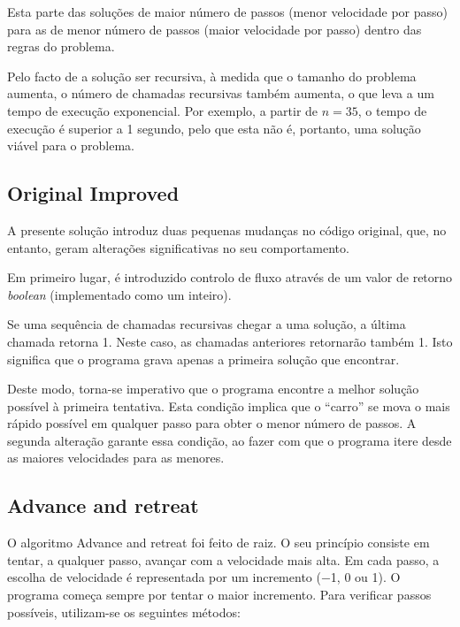 \documentclass[portuguese,11pt,a4paper,titlepage]{article}
\newcommand{\extrang}[1]{\textit{#1}}
\newcommand{\srcdir}{..}
\begin{document}
Esta parte das soluções de maior número de passos (menor velocidade por passo) para
as de menor número de passos (maior velocidade por passo) dentro das regras do problema.

Pelo facto de a solução ser recursiva, à medida que o tamanho do problema aumenta,
o número de chamadas recursivas também aumenta, o que leva a um tempo de execução exponencial.
Por exemplo, a partir de \begin{math}n = 35\end{math}, o tempo de execução é superior a 1 segundo,
pelo que esta não é, portanto, uma solução viável para o problema. 

\subsection{Original Improved} \label{original_improved}
A presente solução introduz duas pequenas mudanças no código original, que, no entanto,
geram alterações significativas no seu comportamento.

Em primeiro lugar, é introduzido controlo de fluxo através de um valor de retorno
\extrang{boolean} (implementado como um inteiro).

Se uma sequência de chamadas recursivas chegar a uma solução, a última chamada
retorna 1. 
Neste caso, as chamadas anteriores retornarão também 1.
Isto significa que o programa grava apenas a primeira solução que encontrar.

Deste modo, torna-se imperativo que o programa encontre a melhor solução possível
à primeira tentativa. Esta condição implica que o ``carro'' se mova o mais rápido possível
em qualquer passo para obter o menor número de passos. A segunda alteração
garante essa condição, ao fazer com que o programa itere
desde as maiores velocidades para as menores.


\subsection{Advance and retreat}
O algoritmo Advance and retreat foi feito de raiz. O seu princípio 
consiste em tentar, a qualquer passo, avançar com a velocidade mais alta.
Em cada passo, a escolha de velocidade é representada por um incremento
($-$1, 0 ou 1). O programa começa sempre por tentar o maior incremento.
Para verificar passos possíveis, utilizam-se os seguintes métodos:
\end{document}
